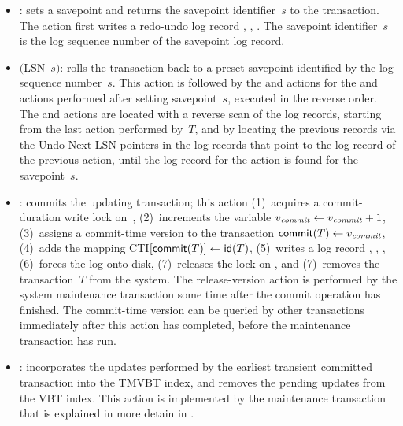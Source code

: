 \begin{itemize}
  \item {}: sets a savepoint and returns the savepoint
  identifier~$s$ to the transaction.
  The action first writes a redo-undo log record , ,
  . 
  The savepoint identifier~$s$ is the log sequence number of the savepoint
  log record.

  \item {}$($LSN~$s)$: rolls the transaction
  back to a preset savepoint identified by the log sequence number~$s$.
  This action is followed by the  and
   actions for the  and
   actions performed after setting savepoint~$s$, executed
  in the reverse order. 
  The  and  actions are located with a reverse
  scan of the log records, starting from the last action performed by~$T$,
  and by locating the previous records via the Undo-Next-LSN
  pointers in the log records that point to the log record of the previous
  action, until the log record for the  action is found
  for the savepoint~$s$.

  \item {}: commits the updating transaction; this action
  (1)~acquires a commit-duration write lock on~\comver,
  (2)~increments the variable $\smash{v_{\text{\textit{commit}}}} \gets \smash{v_{\text{\textit{commit}}}} + 1$,
  (3)~assigns a commit-time version to the transaction
  $\text{\textsf{commit}}(T) \gets \smash{v_{\text{\textit{commit}}}}$,
  (4)~adds the mapping CTI$[\text{\textsf{commit}}(T)] \gets \text{\textsf{id}}(T)$, 
  (5)~writes a log record , , \lre{\comver},
  (6)~forces the log onto disk, 
  (7)~releases the lock on \comver, and
  (7)~removes the transaction~$T$ from the system.
  The release-version action is performed by the system maintenance
  transaction some time after the commit operation has finished.
  The commit-time version  can be queried by other
  transactions immediately after this action has completed, before the
  maintenance transaction has run.

  \item {}: incorporates the updates performed by the
  earliest transient committed transaction into the TMVBT index, and removes
  the pending updates from the VBT index.
  This action is implemented by the maintenance transaction that is explained
  in more detain in .


\end{itemize}
